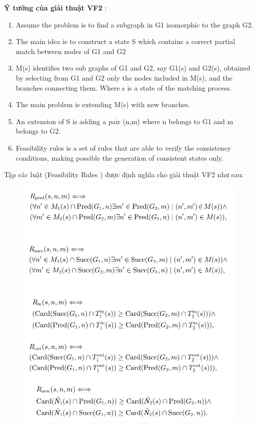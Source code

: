 \documentclass[12pt]{report}
\begin{document}
\noindent \textbf{Ý tưởng của giải thuật VF2} \cite{vf2}:
\begin{enumerate}
	\item Assume the problem is to find a subgraph in G1 isomorphic to the graph G2.
	\item The main idea is to construct a state S which contains a correct partial match between nodes of G1 and G2
	\item M(s) identifies two sub graphs of G1 and G2, say G1(s) and G2(s),
	 obtained by selecting from G1 and G2 only the nodes included in M(s),
	  and the branches connecting them. Where s is a state of the matching process. 
	\item The main problem is extending M(s) with new branches.
	\item An extension of S is adding a pair (n,m) where n belongs to G1 and m belongs to G2.
	\item Feasibility rules is a set of rules that are able to verify the consistency conditions,
	 making possible the generation of consistent states only.
\end{enumerate}
\newpage
Tập các luật (Feasibility Rules \cite{vf2_1368}) được định nghĩa cho giải thuật VF2 như sau:
\begin{figure}[!htbp]
	\centering
	\includegraphics[scale=0.5]{images/rule_}
\end{figure}
\end{document}
